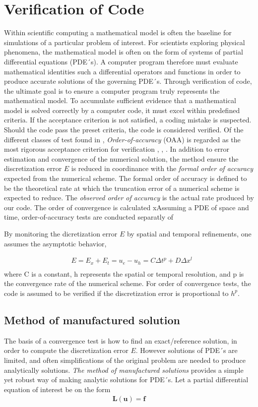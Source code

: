 \section{Verification of Code}
Within scientific computing a mathematical model is often the baseline for simulations of a particular problem of interest. For scientists exploring physical phenomena, the mathematical model is often on the form of systems of partial differential equations (PDE´s). A computer program therefore must evaluate  mathematical identities such a differential operators and functions in order to produce accurate solutions of the governing PDE´s. 
Through verification of code, the ultimate goal is to ensure a computer program truly represents the mathematical model. To accumulate sufficient evidence that a mathematical model is solved correctly by a computer code,  it must excel within predefined criteria. If the acceptance criterion is not satisfied, a coding mistake is suspected. Should the code pass the preset criteria, the code is considered verified. Of the different classes of test found in \cite{Roache},  \textit{Order-of-accuracy} (OAA)  is regarded as the most rigorous acceptance criterion for verification \cite{Biggs}, \cite{Roache}, \cite{Etienne2006}. In addition to error estimation and convergence of the numerical solution, the method ensure the discretization error $E$ is reduced in coordinance with the \textit{formal order of accuracy} expected from the numerical scheme. The formal order of accuracy is defined to be the theoretical rate at which the truncation error of a numerical scheme is expected to reduce. The \textit{observed order of accuracy} is the actual rate produced by our code. The order of convergence is calculated  xAssuming a PDE of space and time, order-of-accuracy tests are conducted separatly of 

By monitoring the dicretization error $E$ by spatial and temporal refinements, one assumes the asymptotic behavior,

\begin{align*}
&E = E_x + E_t = u_e - u_h = C\Delta t^p + D\Delta x^l\\
\end{align*} 
where C is a constant, h represents the spatial or temporal resolution, and p is the convergence rate of the numerical scheme. For order of convergence tests, the code is assumed to be verified if the discretization error is proportional to $h^p$.

\subsection{Method of manufactured solution}
The basis of a convergence test is how to find an exact/reference solution, in order to compute the discretization error $E$. However solutions of PDE´s are limited, and often simplifications of the original problem are needed to produce analytically solutions.  \textit{The method of manufactured solutions} provides a simple yet robust way of making analytic solutions for PDE´s. 
Let a  partial differential equation of interest be on the form
\begin{align*}
\textbf{L}(\textbf{u}) = \textbf{f}
\end{align*}


